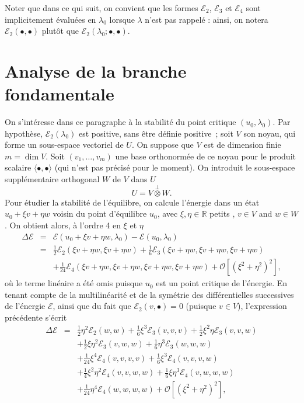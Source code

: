\documentclass[12pt, final]{amsart}
\begin{document}
Noter que dans ce qui suit, on convient que les formes $\mathcal{E}_2$,
$\mathcal{E}_3$ et $\mathcal{E}_4$ sont implicitement évaluées en
$\lambda_0$ lorsque $\lambda$ n'est pas rappelé : ainsi, on notera
$\mathcal{E}_2 (\bullet, \bullet)$ plut{\^o}t que $\mathcal{E}_2 (\lambda_0 ;
\bullet, \bullet)$.

\section{Analyse de la branche fondamentale}

On s'intéresse dans ce paragraphe {\`a} la stabilité du point critique
$(u_0, \lambda_0) .$ Par hypoth{\`e}se, $\mathcal{E}_2 (\lambda_0)$ est
positive, sans {\^e}tre définie positive~; soit $V$ son noyau, qui forme
un sous-espace vectoriel de $U$. On suppose que $V$ est de dimension finie $m
= \dim V$. Soit $(v_1, \ldots, v_m)$ une base orthonormée de ce noyau pour
le produit scalaire $\langle \bullet, \bullet \rangle$ (qui n'est pas
précisé pour le moment). On introduit le sous-espace
supplémentaire orthogonal $W$ de $V$ dans $U$
\begin{equation}
  U = V \overset{\perp}{\otimes} W.
\end{equation}
Pour étudier la stabilité de l'équilibre, on calcule l'énergie
dans un état $u_0 + \xi v + \eta w$ voisin du point d'équilibre $u_0$,
avec $\xi, \eta \in \mathbb{R}$ {\guillemotleft} petits {\guillemotright}, $v
\in V$ and $w \in W$. On obtient alors, {\`a} l'ordre 4 en $\xi$ et $\eta$
\begin{eqnarray}
  \Delta \mathcal{E} & = & \mathcal{E} (u_0 + \xi v + \eta w, \lambda_0)
  -\mathcal{E} (u_0, \lambda_0) \nonumber\\
  & = & \tfrac{1}{2} \mathcal{E}_2 (\xi v + \eta w, \xi v + \eta w) +
  \tfrac{1}{6} \mathcal{E}_3 (\xi v + \eta w, \xi v + \eta w, \xi v + \eta w)
  \nonumber\\
  &  &  + \tfrac{1}{24} \mathcal{E}_4 (\xi v + \eta w, \xi v + \eta
  w, \xi v + \eta w, \xi v + \eta w) +\mathcal{O} [(\xi^2 + \eta^2)^2],
\end{eqnarray}
o{\`u} le terme linéaire a été omis puisque $u_0$ est un point
critique de l'énergie. En tenant compte de la multilinéarité et de
la symétrie des différentielles successives de l'énergie
$\mathcal{E}$, ainsi que du fait que $\mathcal{E}_2 (v, \bullet) = 0$ (puisque
$v \in V$), l'expression précédente s'écrit
\begin{eqnarray}
  \Delta \mathcal{E} & = & \tfrac{1}{2} \eta^2 \mathcal{E}_2 (w, w) +
  \tfrac{1}{6} \xi^3 \mathcal{E}_3 (v, v, v) + \tfrac{1}{2} \xi^2 \eta
  \mathcal{E}_3 (v, v, w) \nonumber\\
  &  & + \tfrac{1}{2} \xi \eta^2 \mathcal{E}_3 (v, w, w) + \tfrac{1}{6}
  \eta^3 \mathcal{E}_3 (w, w, w) \nonumber\\
  &  & + \tfrac{1}{24} \xi^4 \mathcal{E}_4 (v, v, v, v) + \tfrac{1}{6} \xi^3
  \mathcal{E}_4 (v, v, v, w) \nonumber\\
  &  & + \tfrac{1}{4} \xi^2 \eta^2 \mathcal{E}_4 (v, v, w, w) + \tfrac{1}{6}
  \xi \eta^3 \mathcal{E}_4 (v, w, w, w) \nonumber\\
  &  & + \tfrac{1}{24} \eta^4 \mathcal{E}_4 (w, w, w, w) +\mathcal{O} [(\xi^2
  + \eta^2)^2],
\end{eqnarray}
\end{document}
